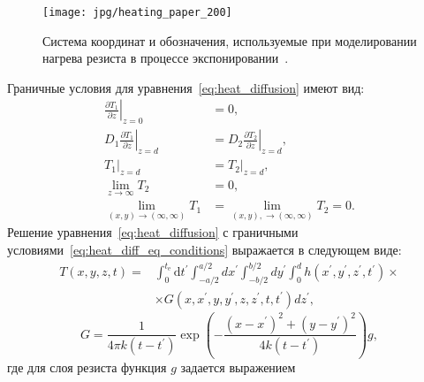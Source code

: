 \begin{figure}
	\centering
	\texttt{[image: jpg/heating\_paper\_200]}
	\caption{Система координат и обозначения, используемые при моделировании нагрева резиста в процессе экспонировании~\cite{Cui_heating}.}
	\label{fig:heating_paper}
\end{figure}
Граничные условия для уравнения~\ref{eq:heat_diffusion} имеют вид:
\begin{equation} \label{eq:heat_diff_eq_conditions}
	\begin{aligned}
		\left.\frac{\partial T_1}{\partial z}\right|_{z=0} &= 0, \\
		D_1 \left.\frac{\partial T_1}{\partial z}\right|_{z=d} &= D_2 \left.\frac{\partial T_2}{\partial z}\right|_{z=d}, \\
		\left.T_1\right|_{z=d} &= \left.T_2\right|_{z=d}, \\
		\lim _{z \rightarrow \infty} T_2 &= 0, \\
		\lim _{(x,y) \rightarrow (\infty, \infty)} T_1 &= \lim _{(x,y), \rightarrow (\infty, \infty)} T_2 = 0.
	\end{aligned}
\end{equation}
Решение уравнения~\ref{eq:heat_diffusion} с граничными условиями~\ref{eq:heat_diff_eq_conditions} выражается в следующем виде:
\begin{equation} \label{eq:heat_final_equation}
	\begin{split}
		T(x, y, z, t) = & \int_0^{t_\mathrm{e}} \mathrm{d} t^{\prime} \int_{-a / 2}^{a / 2} d x^{\prime} \int_{-b / 2}^{b / 2} d y^{\prime} \int_0^d h\left(x^{\prime}, y^{\prime}, z^{\prime}, t^{\prime}\right) \times \\ & \times G\left(x, x^{\prime}, y, y^{\prime}, z, z^{\prime}, t, t^{\prime}\right) d z^{\prime},
	\end{split}
\end{equation}
\begin{equation}
	G=\frac{1}{4 \pi k\left(t-t^{\prime}\right)} \exp \left(-\frac{\left(x-x^{\prime}\right)^2+\left(y-y^{\prime}\right)^2}{4 k\left(t-t^{\prime}\right)}\right) g,
\end{equation}
где для слоя резиста функция $g$ задается выражением
